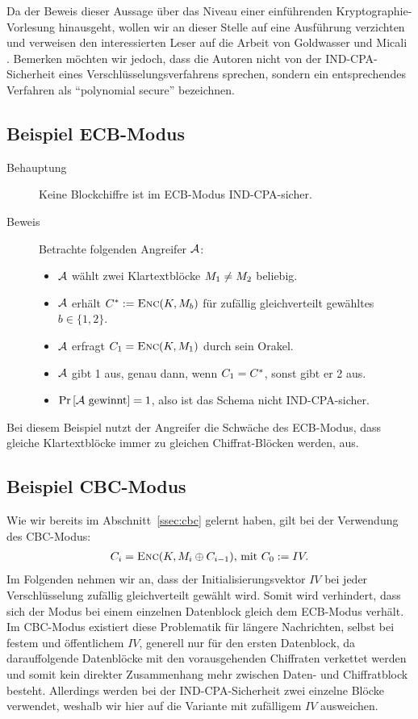 Da der Beweis dieser Aussage über das Niveau einer einführenden Kryptographie-Vorlesung hinausgeht, wollen wir an dieser Stelle auf eine Ausführung verzichten und verweisen den interessierten Leser auf die Arbeit von Goldwasser und Micali \cite{Goldwasser1984}. Bemerken möchten wir jedoch, dass die Autoren nicht von der IND-CPA-Sicherheit eines Verschlüsselungsverfahrens sprechen, sondern ein entsprechendes Verfahren als "`polynomial secure"' bezeichnen. 

\subsection{Beispiel ECB-Modus}
\begin{description} 
	\item[Behauptung] Keine Blockchiffre ist im ECB-Modus IND-CPA-sicher.
	\item[Beweis] Betrachte folgenden Angreifer $\mathcal{A}$:
	\begin{itemize}
		\item $\mathcal{A}$ wählt zwei Klartextblöcke $M_1 \neq M_2$ beliebig.
		\item $\mathcal{A}$ erhält  $C^{*} := \textsc{Enc}(K, M_{b})$ für zufällig gleichverteilt gewähltes $b \in \{1, 2\}$.
		\item $\mathcal{A}$ erfragt $C_1 = \textsc{Enc}(K, M_1)$ durch sein Orakel.
		\item $\mathcal{A}$ gibt 1 aus, genau dann, wenn $C_1 = C^{*}$, sonst gibt er 2 aus.
		\item $\Pr \left[ \mathcal{A} \text{ gewinnt} \right] = 1$, also ist das Schema nicht IND-CPA-sicher.
	\end{itemize}
\end{description}
Bei diesem Beispiel nutzt der Angreifer die Schwäche des ECB-Modus, dass gleiche Klartextblöcke immer zu gleichen Chiffrat-Blöcken werden, aus.

\subsection{Beispiel CBC-Modus}
Wie wir bereits im Abschnitt~\ref{ssec:cbc} gelernt haben, gilt bei der Verwendung des CBC-Modus: 
\begin{align*}
C_i = \textsc{Enc}(K, M_i \oplus C_{i-1}) \text{, mit } C_0 := IV.
\end{align*}
Im Folgenden nehmen wir an, dass der Initialisierungsvektor $IV$ bei jeder Verschlüsselung zufällig gleichverteilt gewählt wird. Somit wird verhindert, dass sich der Modus bei einem einzelnen Datenblock gleich dem ECB-Modus verhält. Im CBC-Modus existiert diese Problematik für längere Nachrichten, selbst bei festem und öffentlichem $IV$, generell nur für den ersten Datenblock, da darauffolgende Datenblöcke mit den vorausgehenden Chiffraten verkettet werden und somit kein direkter Zusammenhang mehr zwischen Daten- und Chiffratblock besteht. Allerdings werden bei der IND-CPA-Sicherheit zwei einzelne Blöcke verwendet, weshalb wir hier auf die Variante mit zufälligem $IV$ ausweichen.

